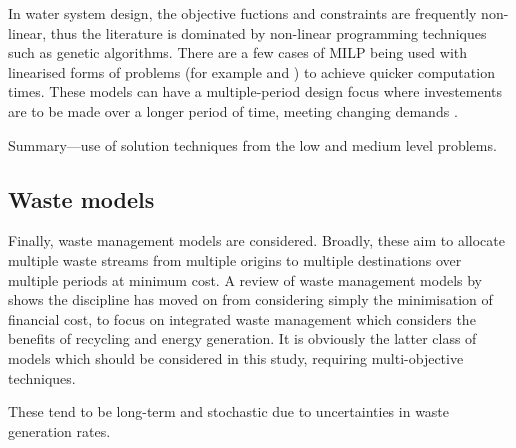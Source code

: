 In water system design, the objective fuctions and constraints are frequently non-linear, thus the literature is dominated by non-linear programming techniques such as genetic algorithms. There are a few cases of MILP being used with linearised forms of problems (for example \citet{Zanganeh2010} and \citet{Lejano2006}) to achieve quicker computation times. These models can have a multiple-period design focus where investements are to be made over a longer period of time, meeting changing demands \citep{Chung2008}.

Summary---use of solution techniques from the low and medium level problems.

\subsection{Waste models}
Finally, waste management models are considered. Broadly, these aim to allocate multiple waste streams from multiple origins to multiple destinations over multiple periods at minimum cost. 
A review of waste management models by \citet{Morrissey2004} shows the discipline has moved on from considering simply the minimisation of financial cost, to focus on integrated waste management which considers the benefits of recycling and energy generation. It is obviously the latter class of models which should be considered in this study, requiring multi-objective techniques.

These tend to be long-term and stochastic due to uncertainties in waste generation rates.

